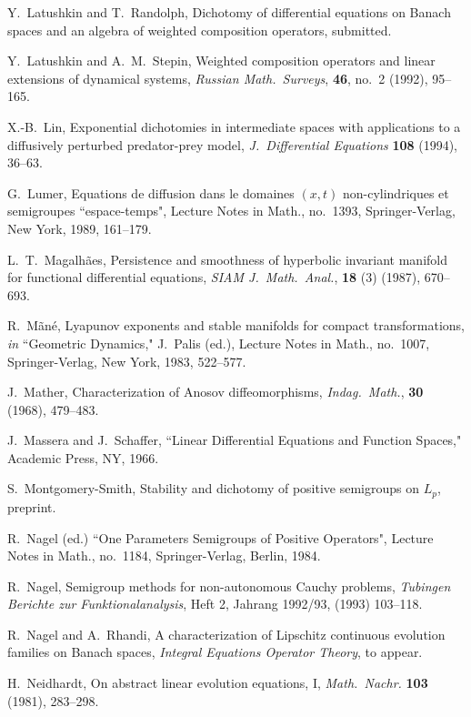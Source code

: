 \begin{thebibliography}{99}
 Y.~Latushkin and T.~Randolph,
Dichotomy of differential equations on Banach spaces and an
algebra of weighted composition operators,
submitted.

 Y.~Latushkin and A.~M.~Stepin,
Weighted composition operators and linear extensions of dynamical
systems,
{\em Russian Math.~Surveys},
{\bf 46}, no.~2 (1992), 95--165.

 X.-B.~Lin,
Exponential dichotomies in intermediate spaces with applications
to a diffusively perturbed predator-prey model,
{\em J.~Differential Equations}
{\bf 108} (1994), 36--63.

  G.~Lumer,
Equations de diffusion dans le domaines $(x,t)$ non-cylindriques et
semigroupes ``espace-temps",
Lecture Notes in Math., no.~1393,
Springer-Verlag, New York, 1989, 161--179.

 L.~T.~Magalh\~aes,
Persistence and smoothness of hyperbolic
invariant manifold for functional differential equations,
{\em SIAM J.~Math.~Anal.},
{\bf 18} (3) (1987), 670--693.

 R.~M\~an\'e,
Lyapunov exponents and stable manifolds for compact transformations,
{\em in} ``Geometric Dynamics," J.~Palis (ed.),
Lecture Notes in Math., no.~1007,  Springer-Verlag, New York, 1983,
522--577.

 J.~Mather,
Characterization of Anosov diffeomorphisms,
{\em Indag.~Math.},
{\bf 30} (1968), 479--483.

 J.~Massera and J.~Schaffer,
``Linear Differential Equations and Function Spaces,"
Academic Press, NY, 1966.

 S.~Montgomery-Smith,
Stability and dichotomy of positive semigroups on $L_p$,
preprint.

 R.~Nagel (ed.)
``One Parameters Semigroups of Positive Operators",
Lecture Notes in Math., no.~1184, Springer-Verlag, Berlin, 1984.

 R.~Nagel,
Semigroup methods for non-autonomous Cauchy problems,
{\em Tubingen Berichte zur Funktionalanalysis},
Heft 2, Jahrang 1992/93, (1993) 103--118.

 R.~Nagel and A.~Rhandi,
A characterization of Lipschitz continuous evolution families on
Banach spaces,
{\em Integral Equations Operator Theory},
to appear.

 H.~Neidhardt,
On abstract linear evolution equations, I,
{\em Math.~Nachr.}
{\bf 103} (1981), 283--298.


\end{thebibliography}
